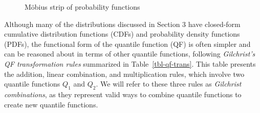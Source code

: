 \documentclass[
  fleqn,
  deca,
  blindrev
]{informs4}
\begin{document}
\begin{figure}


\caption{\label{fig-moebius-chart}Möbius strip of probability functions
\citep{perepolkin2023TenetsQuantilebasedInference}}

\end{figure}%

Although many of the distributions discussed in Section 3 have
closed-form cumulative distribution functions (CDFs) and probability
density functions (PDFs), the functional form of the quantile function
(QF) is often simpler and can be reasoned about in terms of other
quantile functions, following \emph{Gilchrist's QF transformation rules}
summarized in Table~\ref{tbl-qf-trans}. This table presents the
addition, linear combination, and multiplication rules, which involve
two quantile functions \(Q_1\) and \(Q_2\). We will refer to these three
rules as \emph{Gilchrist combinations}, as they represent valid ways to
combine quantile functions to create new quantile functions.
\end{document}

